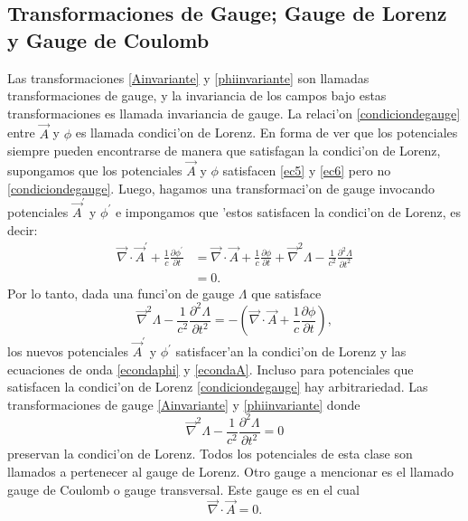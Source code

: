 \subsection{Transformaciones de Gauge; Gauge de Lorenz y Gauge de Coulomb}
Las transformaciones \eqref{Ainvariante} y \eqref{phiinvariante} son llamadas transformaciones de gauge, y la invariancia de los campos bajo estas transformaciones es llamada invariancia de gauge. La relaci'on \eqref{condiciondegauge} entre $\vec{A}$ y $\phi$ es llamada condici'on de Lorenz. En forma de ver que los potenciales siempre pueden encontrarse de manera que satisfagan la condici'on de Lorenz, supongamos que los potenciales $\vec{A}$ y $\phi$ satisfacen \eqref{ec5} y \eqref{ec6} pero no \eqref{condiciondegauge}. Luego, hagamos una transformaci'on de gauge invocando potenciales $\vec{A}^\prime$ y $\phi^\prime$ e impongamos que 'estos satisfacen la condici'on de Lorenz, es decir:
\begin{equation}
\begin{aligned}
\vec{\nabla}\cdot\vec{A}^\prime+\frac{1}{c}\frac{\partial\phi^\prime}{\partial t}&=\vec{\nabla}\cdot\vec{A}+\frac{1}{c}\frac{\partial\phi}{\partial t}+\vec{\nabla}^2\Lambda-\frac{1}{c^2}\frac{\partial^2\Lambda}{\partial t^2} \\
&=0.
\end{aligned}
\end{equation}
Por lo tanto, dada una funci'on de gauge $\Lambda$ que satisface
\begin{equation}
\vec{\nabla}^2\Lambda-\frac{1}{c^2}\frac{\partial^2\Lambda}{\partial t^2}=-\left(\vec{\nabla}\cdot\vec{A}+\frac{1}{c}\frac{\partial\phi}{\partial t}\right),
\end{equation}
los nuevos potenciales $\vec{A}^\prime$ y $\phi^\prime$ satisfacer'an la condici'on de Lorenz y las ecuaciones de onda \eqref{econdaphi} y \eqref{econdaA}.
Incluso para potenciales que satisfacen la condici'on de Lorenz \eqref{condiciondegauge} hay arbitrariedad. Las transformaciones de gauge \eqref{Ainvariante} y \eqref{phiinvariante} donde 
\begin{equation}
\vec{\nabla}^2\Lambda-\frac{1}{c^2}\frac{\partial^2\Lambda}{\partial t^2}=0
\end{equation}
preservan la condici'on de Lorenz. Todos los potenciales de esta clase son llamados a pertenecer al gauge de Lorenz.
Otro gauge a mencionar es el llamado gauge de Coulomb o gauge transversal. Este gauge es en el cual
\begin{equation}
\vec{\nabla}\cdot\vec{A}=0.
\end{equation}
